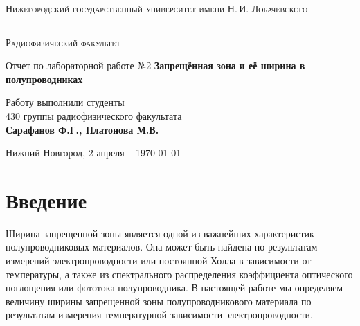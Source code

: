 \documentclass[a4paper,14pt]{extarticle}
\def\labauthors{Сарафанов Ф.Г., Платонова М.В.}
\def\labnumber{2}
\begin{document}
\begin{titlepage}
\begin{center}
{\small\textsc{Нижегородский государственный университет имени Н.\,И. Лобачевского}}
\vskip 2pt \hrule \vskip 3pt
{\small\textsc{Радиофизический факультет}}

\vfill


{{\large Отчет по лабораторной работе №\labnumber}\vskip 12pt {\Huge \bfseries Запрещённая зона}\vskip 2pt {\LARGE \bfseries и её ширина в полупроводниках}}

	
\vspace{2cm}
{\large Работу выполнили студенты \\[-0.25em] 430 группы радиофизического факультата \\[0.5em] {\Large \bfseries \labauthors}}



\end{center}

\vfill
	
	
	
\begin{center}
	{Нижний Новгород, 2 апреля -- \today}
\end{center}

\end{titlepage}
\tableofcontents
\newpage





\section*{Введение}
Ширина запрещенной зоны является одной из важнейших характеристик полупроводниковых материалов. Она может быть найдена
по результатам измерений электропроводности или постоянной Холла в зависимости от температуры, а также из спектрального 
распределения коэффициента оптического поглощения или фототока полупроводника. В настоящей работе мы определяем величину ширины запрещенной зоны полупроводникового материала по результатам измерения температурной зависимости 
электропроводности. 
\end{document}
